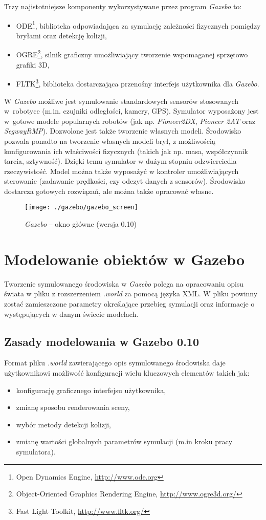  	Trzy najistotniejsze komponenty wykorzystywane przez program \textit{Gazebo} to:
 	\begin{itemize}
 	 \item ODE\footnote{Open Dynamics Engine, \url{http://www.ode.org}}, biblioteka  odpowiadająca za symulację
 	 	zależności fizycznych pomiędzy bryłami oraz detekcję kolizji,
 	 \item OGRE\footnote{Object-Oriented Graphics Rendering Engine, \url{http://www.ogre3d.org/}}, 
		silnik graficzny umożliwiający tworzenie wspomaganej sprzętowo grafiki 3D,
 	 \item FLTK\footnote{Fast Light Toolkit, \url{http://www.fltk.org/}}, biblioteka dostarczająca 
		przenośny interfejs użytkownika dla \textit{Gazebo}.
 	\end{itemize}

	W \textit{Gazebo} możliwe jest symulowanie standardowych sensorów stosowanych w~robotyce (m.in. czujniki odległości, kamery, GPS). Symulator wyposażony jest w~gotowe modele 
	popularnych robotów (jak np. \textit{Pioneer2DX}, \textit{Pioneer 2AT} oraz \textit{SegwayRMP}).
	Dozwolone jest także tworzenie własnych modeli.
	Środowisko pozwala ponadto na tworzenie własnych modeli brył, z możliwością konfigurowania ich właściwości fizycznych (takich jak np. masa, współczynnik tarcia, sztywność).
	Dzięki temu symulator w dużym stopniu odzwierciedla rzeczywistość. Model można także wyposażyć w kontroler umożliwiających sterowanie (zadawanie prędkości, 
	czy odczyt danych z sensorów). Środowisko dostarcza gotowych rozwiązań, ale można także opracować własne.
	\begin{figure}[!t]
	\centering
	\label{fig:gazebo}
	\texttt{[image: ./gazebo/gazebo\_screen]}
	\caption{\textit{Gazebo} -- okno główne (wersja 0.10)}
	\end{figure}

	\section{Modelowanie obiektów w Gazebo}
	Tworzenie symulowanego środowiska w \textit{Gazebo} polega na opracowaniu opisu świata w pliku z rozszerzeniem \textit{.world} za pomocą języka XML. W pliku powinny zostać zamieszczone parametry
	określające przebieg symulacji oraz informacje o występujących w danym świecie modelach.
	
	\subsection{Zasady modelowania w Gazebo 0.10}
	Format pliku \textit{.world} zawierającego opis symulowanego środowiska daje użytkownikowi możliwość konfiguracji wielu kluczowych elementów takich jak:
	 \begin{itemize}
	  \item konfigurację graficznego interfejsu użytkownika,
	  \item zmianę sposobu renderowania sceny,
	  \item wybór metody detekcji kolizji,
	  \item zmianę wartości globalnych parametrów symulacji (m.in kroku pracy symulatora).
	 \end{itemize}

